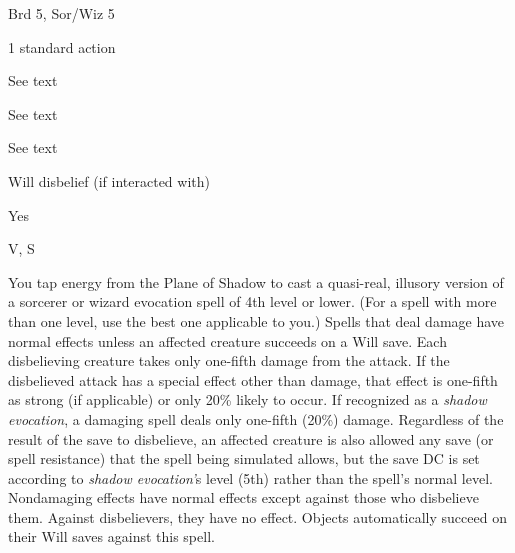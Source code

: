
\begin{description*}
\item[Level:] Brd 5, Sor/Wiz 5
\item[Casting Time:] 1 standard action
\item[Range:] See text
\item[Effect:] See text
\item[Duration:] See text
\item[Saving Throw:] Will disbelief (if interacted with)
\item[Spell Resistance:] Yes
\item[Components:] V, S
\end{description*}

You tap energy from the Plane of Shadow to cast a quasi-real, illusory version
of a sorcerer or wizard evocation spell of 4th level or lower. (For a spell with
more than one level, use the best one applicable to you.)
Spells that deal damage have normal effects unless an affected creature succeeds
on a Will save. Each disbelieving creature takes only one-fifth damage from the
attack. If the disbelieved attack has a special effect other than damage, that
effect is one-fifth as strong (if applicable) or only 20\% likely to occur. If
recognized as a \textit{shadow evocation}, a damaging spell deals only one-fifth
(20\%) damage. Regardless of the result of the save to disbelieve, an affected
creature is also allowed any save (or spell resistance) that the spell being simulated
allows, but the save DC is set according to \textit{shadow evocation'}s level (5th)
rather than the spell's normal level.
Nondamaging effects have normal effects except against those who disbelieve them.
Against disbelievers, they have no effect.
Objects automatically succeed on their Will saves against this spell.